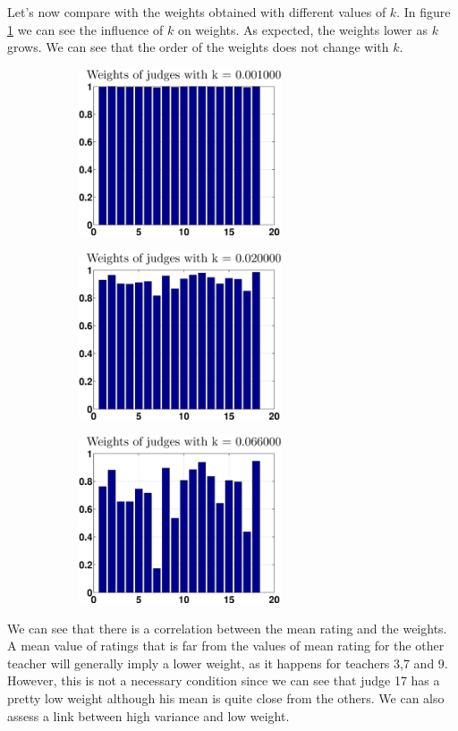 \documentclass[12pt,a4paper]{article}
\begin{document}
Let's now compare with the weights obtained with different values of $k$. In figure \ref{noppk} we can see the influence of $k$ on weights. As expected, the weights lower as $k$ grows. We can see that the order of the weights does not change with $k$.

\begin{figure}[h!]
\centering
\begin{subfigure}[b]{0.48\textwidth}
\includegraphics[width = 6cm]{noPreprocess/weightsk10.eps}
\end{subfigure}
\begin{subfigure}[b]{0.48\textwidth}
\includegraphics[width = 6cm]{noPreprocess/weightsk200.eps}
\end{subfigure}
\begin{subfigure}[b]{0.5\textwidth}
\includegraphics[width = 6cm]{noPreprocess/weightsk660.eps}
\end{subfigure}
\caption{\label{noppk}}
\end{figure}
We can see that there is a correlation between the mean rating and the weights. A mean value of ratings that is far from the values of mean rating for the other teacher will generally imply a lower weight, as it happens for teachers 3,7 and 9. However, this is not a necessary condition since we can see that judge 17 has a pretty low weight although his mean is quite close from the others. We can also assess a link between high variance and low weight.\\
\end{document}
